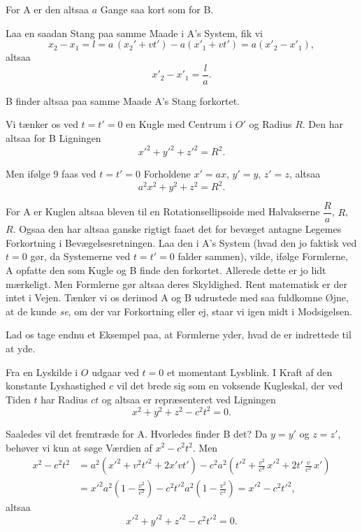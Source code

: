 \documentclass[12pt,a4paper]{article}
\newcommand{\opage}[1]{\marginnote{\footnotesize\textit{[#1]}}}
\begin{document}
For A er den altsaa $a$ Gange saa kort som for B.

Laa en saadan Stang paa samme Maade i A's System, fik vi
\[
  x_{2} - x_{1} = l = a\,(x_{2}{}' + vt') - a(x'_{1} + vt')
    = a(x'_{2} - x'_{1}),
\]
altsaa
\[
  x'_{2} - x'_{1} = \frac{l}{a}.
\]

B finder altsaa paa samme Maade A's Stang forkortet.

Vi tænker os ved $t = t' = 0$ en Kugle med Centrum i $O'$ og Radius $R$.
Den har altsaa for B Ligningen
\[
  {x'}^{2} + {y'}^{2} + {z'}^{2} = R^{2}.
\]

Men ifølge 9 faas ved $t = t' = 0$ Forholdene $x' = ax$, $y' = y$,
$z' = z$, altsaa
\[
  a^{2}x^{2} + y^{2} + z^{2} = R^{2}.
\]

\opage{21} For A er Kuglen altsaa bleven til en Rotationsellipsoide med Halvakserne
$\dfrac{R}{a}$, $R$, $R$. Ogsaa den har altsaa ganske rigtigt faaet det for
bevæget antagne Legemes Forkortning i Bevægelsesretningen. Laa den i A's
System (hvad den jo faktisk ved $t = 0$ gør, da Systemerne ved $t = t' = 0$
falder sammen), vilde, ifølge Formlerne, A opfatte den som Kugle og B finde
den forkortet. Allerede dette er jo lidt mærkeligt. Men Formlerne gør altsaa
deres Skyldighed. Rent matematisk er der intet i Vejen. Tænker vi os derimod
A og B udrustede med saa fuldkomne Øjne, at de kunde \emph{se}, om der var
Forkortning eller ej, staar vi igen midt i Modsigelsen.

Lad os tage endnu et Eksempel paa, at Formlerne yder, hvad de er indrettede
til at yde.

Fra en Lyskilde i $O$ udgaar ved $t = 0$ et momentant Lysblink. I Kraft af den
konstante Lyshastighed $c$ vil det brede sig som en voksende Kugleskal, der ved
Tiden $t$ har Radius $ct$ og altsaa er repræsenteret ved Ligningen
\[
  x^{2} + y^{2} + z^{2} - c^{2}t^{2} = 0.
\]

Saaledes vil det fremtræde for A. Hvorledes finder B det? Da $y = y'$ og
$z = z'$, behøver vi kun at søge Værdien af $x^{2} - c^{2}t^{2}$. Men
\begin{align*}
  x^{2} - c^{2}t^{2}
    &= a^{2}({x'}^{2} + v^{2}{t'}^{2} + 2x'vt')
     - c^{2}a^{2}\left({t'}^{2} + \tfrac{v^{2}}{c^{4}}\,{x'}^{2}
       + 2t'\,\tfrac{v}{c^{2}}\,x'\right)\\
    &= {x'}^{2}a^{2}\left(1 - \frac{v^{2}}{c^{2}}\right)
     - c^{2}{t'}^{2}a^{2}\left(1 - \frac{v^{2}}{c^{2}}\right)
     = {x'}^{2} - c^{2}{t'}^{2},
\end{align*}
altsaa
\[
  {x'}^{2} + {y'}^{2} + {z'}^{2} - c^{2}{t'}^{2} = 0.
\]
\end{document}
